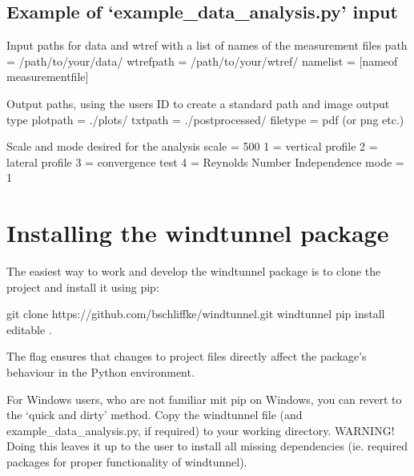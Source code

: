 \documentclass[letterpaper,10pt,english]{sphinxmanual}
\begin{document}
\subsection{Example of ‘example\_data\_analysis.py’ input}
\label{\detokenize{readme_link:example-of-example-data-analysis-py-input}}
%
\begin{sphinxVerbatim}[commandchars=\\\{\}]
\PYGZsh{} Input paths for data and wtref with a list of names of the measurement files
path = \PYGZsq{}/path/to/your/data/\PYGZsq{}
wtref\PYGZus{}path = \PYGZsq{}/path/to/your/wtref/\PYGZsq{}
namelist = [\PYGZsq{}name\PYGZus{}of measurement\PYGZus{}file\PYGZsq{}]

\PYGZsh{} Output paths, using the users ID to create a standard path and image output type
plot\PYGZus{}path = \PYGZsq{}./plots/\PYGZsq{}
txt\PYGZus{}path = \PYGZsq{}./postprocessed/\PYGZsq{}
file\PYGZus{}type = \PYGZsq{}pdf\PYGZsq{} \PYGZsh{} (or \PYGZsq{}png\PYGZsq{} etc.)

\PYGZsh{} Scale and mode desired for the analysis
scale = 500
\PYGZsh{}1 = vertical profile
\PYGZsh{}2 = lateral profile
\PYGZsh{}3 = convergence test
\PYGZsh{}4 = Reynolds Number Independence
mode = 1
\end{sphinxVerbatim}


\section{Installing the windtunnel package}
\label{\detokenize{readme_link:installing-the-windtunnel-package}}
The easiest way to work and develop the windtunnel package is to clone the
project and install it using pip:

%
\begin{sphinxVerbatim}[commandchars=\\\{\}]
\PYGZdl{} git clone https://github.com/bschliffke/windtunnel.git
\PYGZdl{}  windtunnel
\PYGZdl{} pip install \PYGZhy{}\PYGZhy{}editable .
\end{sphinxVerbatim}

The  flag ensures that changes to project files directly affect the
package’s behaviour in the Python environment.

For Windows users, who are not familiar mit pip on Windows, you can revert to the ‘quick and dirty’ method. Copy the windtunnel file (and example\_data\_analysis.py, if required) to your working directory. WARNING! Doing this leaves it up to the user to install all missing dependencies (ie. required packages for proper functionality of windtunnel).
\end{document}
